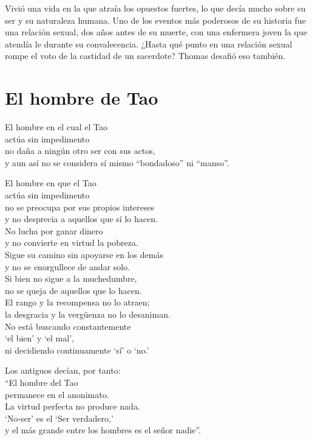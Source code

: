\documentclass[hidelinks]{memoir}
\begin{document}
	Vivió una vida en la que atraía los opuestos fuertes, lo que decía mucho
	sobre su ser y su naturaleza humana. Uno de los eventos más poderosos de
	su historia fue una relación sexual, dos años antes de su muerte, con
	una enfermera joven la que atendía le durante su convalecencia. ¿Hasta
	qué punto en una relación sexual rompe el voto de la castidad de un
	sacerdote? Thomas desafió eso también.
	
	\chapter*{El hombre de Tao}
	
	El hombre en el cual el Tao\\
	actúa sin impedimento\\
	no daña a ningún otro ser con sus actos,\\
	y aun así no se considera sí mismo ``bondadoso'' ni ``manso''.
	
	El hombre en que el Tao\\
	actúa sin impedimento\\
	no se preocupa por sus propios intereses\\
	y no desprecia a aquellos que sí lo hacen.\\
	No lucha por ganar dinero\\
	y no convierte en virtud la pobreza.\\
	Sigue su camino sin apoyarse en los demás\\
	y no se enorgullece de andar solo.\\
	Si bien no sigue a la muchedumbre,\\
	no se queja de aquellos que lo hacen.\\
	El rango y la recompensa no lo atraen;\\
	la desgracia y la vergüenza no lo desaniman.\\
	No está buscando constantemente\\
	`el bien' y `el mal',\\
	ni decidiendo continuamente `sí' o `no.'
	
	Los antiguos decían, por tanto:\\
	``El hombre del Tao\\
	permanece en el anonimato.\\
	La virtud perfecta no produce nada.\\
	`No-ser' es el `Ser verdadero,'\\
	y el más grande entre los hombres es el señor nadie''.
	
\end{document}
